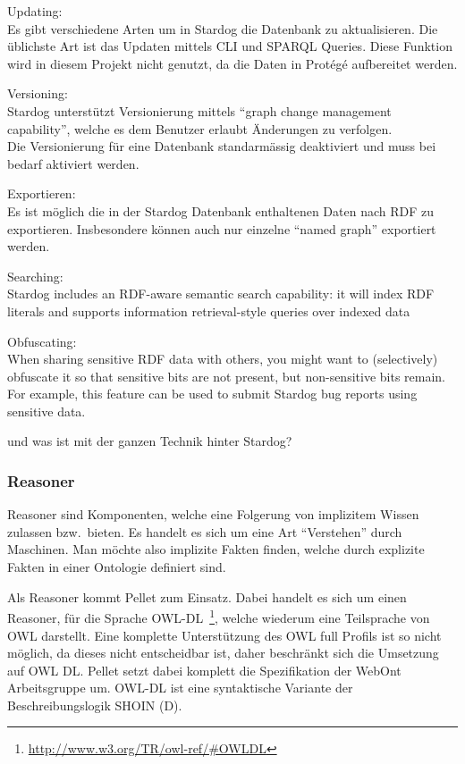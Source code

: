 Updating:\\
Es gibt verschiedene Arten um in Stardog die Datenbank zu aktualisieren. Die üblichste Art ist das Updaten mittels CLI und SPARQL Queries. Diese Funktion wird in diesem Projekt nicht genutzt, da die Daten in Protégé aufbereitet werden.

Versioning:\\
Stardog unterstützt Versionierung mittels ``graph change management capability'', welche es dem Benutzer erlaubt Änderungen zu verfolgen.\\
Die Versionierung für eine Datenbank standarmässig deaktiviert und muss bei bedarf aktiviert werden.

Exportieren:\\
Es ist möglich die in der Stardog Datenbank enthaltenen Daten nach RDF zu exportieren. Insbesondere können auch nur einzelne ``named graph'' exportiert werden.

Searching:\\
Stardog includes an RDF-aware semantic search capability: it will index RDF literals and supports information retrieval-style queries over indexed data

Obfuscating:\\
When sharing sensitive RDF data with others, you might want to (selectively) obfuscate it so that sensitive bits are not present, but non-sensitive bits remain. For example, this feature can be used to submit Stardog bug reports using sensitive data.

und was ist mit der ganzen Technik hinter Stardog? 
\subsubsection{Reasoner}
\label{ssubsec:reasoner}
Reasoner sind Komponenten, welche eine Folgerung von implizitem Wissen zulassen bzw.\ bieten. Es handelt es sich um eine Art ``Verstehen'' durch Maschinen. Man möchte also implizite Fakten finden, welche durch explizite Fakten in einer Ontologie definiert sind. 

Als Reasoner kommt Pellet zum Einsatz. Dabei handelt es sich um einen Reasoner, für die Sprache OWL-DL~\footnote{\url{http://www.w3.org/TR/owl-ref/\#OWLDL}}, welche wiederum eine Teilsprache von OWL darstellt. Eine komplette Unterstützung des OWL full Profils ist so nicht möglich, da dieses nicht entscheidbar ist, daher beschränkt sich die Umsetzung auf OWL DL\@. Pellet setzt dabei komplett die Spezifikation der WebOnt Arbeitsgruppe um. OWL-DL ist eine syntaktische Variante der Beschreibungslogik SHOIN (D).

